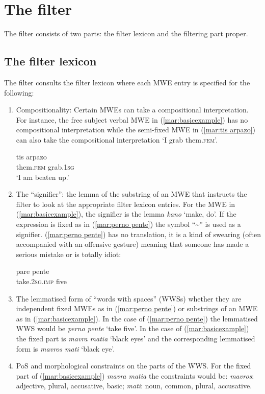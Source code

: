 \documentclass[output=paper]{langsci/langscibook}
\begin{document}
\section{The filter}
Τhe filter consists of two parts: the filter lexicon and the filtering part proper. 

\subsection{The filter lexicon}
The filter consults the filter lexicon where each MWE entry is specified for the following:

\begin{enumerate}
\item Compositionality: Certain MWEs can take a compositional interpretation. For instance, the free subject verbal MWE in (\ref{mar:basicexample}) has no compositional interpretation while the semi-fixed MWE in (\ref{mar:tis arpazo}) can also take the compositional interpretation `I grab them.\textsc{fem}’. 

\ea\label{mar:tis arpazo}
\gll tis                  arpazo\\
them.\textsc{fem} grab.\textsc{1sg}\\
\glt `I am beaten up.’
\z

\item The ``signifier'': the lemma of the substring of an MWE that instructs the filter to look at the appropriate filter lexicon entries. For the MWE in (\ref{mar:basicexample}), the signifier is the lemma \textit{kano} `make, do'. If the expression is fixed as in (\ref{mar:perno pente}) the symbol ``\textasciitilde{}'' is used as a signifier.  (\ref{mar:perno pente}) has no translation, it is a kind of swearing (often accompanied with an offensive gesture) meaning that someone has made a serious mistake or is totally idiot:
  
 \ea\label{mar:perno pente}
\gll pare pente\\
take.\textsc{2sg}.\textsc{imp} five\\ 
\z

\item The lemmatised form of  ``words with spaces'' (WWSs) whether they are independent fixed MWEs as in (\ref{mar:perno pente}) or substrings of an MWE as in (\ref{mar:basicexample}). In the case of (\ref{mar:perno pente}) the lemmatised WWS would be \textit{perno pente} `take five'. In the case of (\ref{mar:basicexample}) the fixed part is \textit{mavra matia} `black eyes' and the corresponding lemmatised form is \textit{mavros mati} `black eye'.\\

\item PoS and morphological constraints on the parts of the WWS. For the fixed part of (\ref{mar:basicexample}) \textit{mavra matia} the constraints would be: \textit{mavros}: adjective, plural, accusative, basic; \textit{mati}: noun, common, plural, accusative. 
\end{enumerate}
\end{document}
